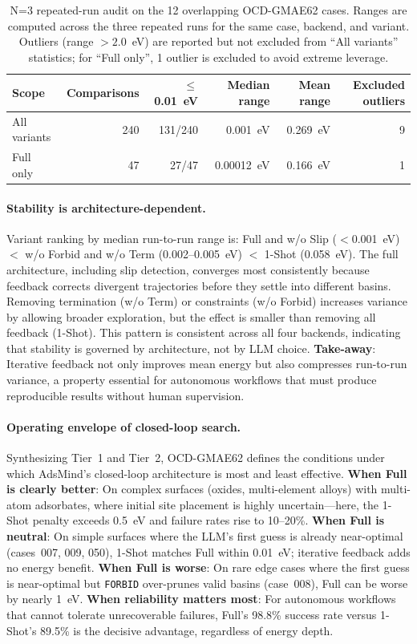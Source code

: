 \begin{table}[t]
\centering
\scriptsize
\caption{N=3 repeated-run audit on the 12 overlapping OCD-GMAE62 cases. Ranges are computed across the three repeated runs for the same case, backend, and variant. Outliers (range $>2.0$~eV) are reported but not excluded from ``All variants'' statistics; for ``Full only'', 1 outlier is excluded to avoid extreme leverage.}
\label{tab:ocd62-tier2-stability}
\begin{tabular}{lrrrrr}
\toprule
Scope & Comparisons & $\leq$0.01~eV & Median range & Mean range & Excluded outliers \\
\midrule
All variants & 240 & 131/240 & 0.001~eV & 0.269~eV & 9 \\
Full only & 47 & 27/47 & 0.00012~eV & 0.166~eV & 1 \\
\bottomrule
\end{tabular}
\end{table}

\paragraph{Stability is architecture-dependent.}
Variant ranking by median run-to-run range is: Full and w/o Slip ($<$0.001~eV) $<$ w/o Forbid and w/o Term (0.002--0.005~eV) $<$ 1-Shot (0.058~eV).
The full architecture, including slip detection, converges most consistently because feedback corrects divergent trajectories before they settle into different basins.
Removing termination (w/o Term) or constraints (w/o Forbid) increases variance by allowing broader exploration, but the effect is smaller than removing all feedback (1-Shot).
This pattern is consistent across all four backends, indicating that stability is governed by architecture, not by LLM choice.
\textbf{Take-away}: Iterative feedback not only improves mean energy but also compresses run-to-run variance, a property essential for autonomous workflows that must produce reproducible results without human supervision.

\paragraph{Operating envelope of closed-loop search.}
Synthesizing Tier~1 and Tier~2, OCD-GMAE62 defines the conditions under which AdsMind's closed-loop architecture is most and least effective.
\textbf{When Full is clearly better}: On complex surfaces (oxides, multi-element alloys) with multi-atom adsorbates, where initial site placement is highly uncertain---here, the 1-Shot penalty exceeds 0.5~eV and failure rates rise to 10--20\%.
\textbf{When Full is neutral}: On simple surfaces where the LLM's first guess is already near-optimal (cases~007, 009, 050), 1-Shot matches Full within 0.01~eV; iterative feedback adds no energy benefit.
\textbf{When Full is worse}: On rare edge cases where the first guess is near-optimal but \texttt{FORBID} over-prunes valid basins (case~008), Full can be worse by nearly 1~eV.
\textbf{When reliability matters most}: For autonomous workflows that cannot tolerate unrecoverable failures, Full's 98.8\% success rate versus 1-Shot's 89.5\% is the decisive advantage, regardless of energy depth.

